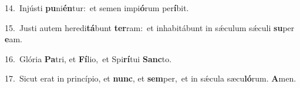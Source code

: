 {\numbfont\textcolor{\numbcolor}{14.}}~Injústi \textbf{pu}\-ni\-\textbf{én}\-tur:~\star et semen impi\-\textbf{ó}\-rum per\-\textbf{í}\-bit.\par
{\numbfont\textcolor{\numbcolor}{15.}}~Justi autem heredi\-\textbf{tá}\-bunt \textbf{ter}\-ram:~\star et inhabitábunt in sǽculum sǽculi \textbf{su}\-per \textbf{e}\-am.\par
{\numbfont\textcolor{\numbcolor}{16.}}~Glória \textbf{Pa}\-tri, et \textbf{Fí}\-lio,~\star et Spi\-\textbf{rí}\-tui \textbf{Sanc}\-to.\par
{\numbfont\textcolor{\numbcolor}{17.}}~Sicut erat in princípio, et \textbf{nunc}\-, et \textbf{sem}\-per,~\star et in sǽcula sæcu\-\textbf{ló}\-rum. \textbf{A}\-men.\par
